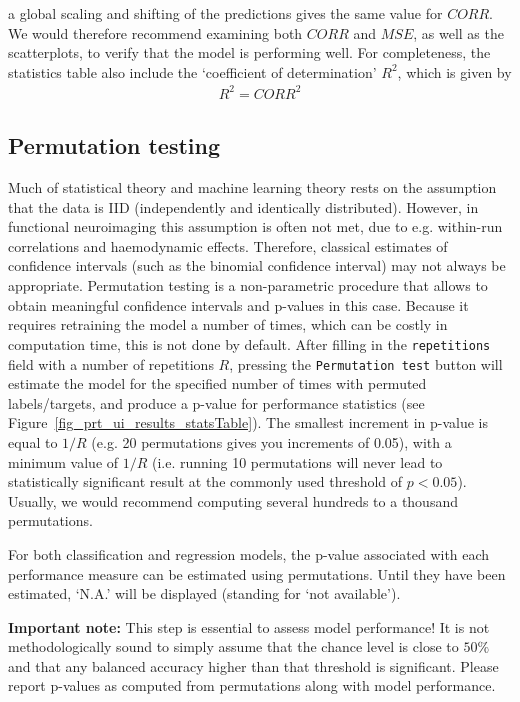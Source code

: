 a global scaling and shifting of the predictions gives the same value for $CORR$. 
We would therefore recommend examining both $CORR$ and $MSE$, as well as the scatterplots, to verify that the model is performing well.  For completeness, the statistics table also include the `coefficient of determination' $R^2$, which is given by
\begin{equation}
\begin{aligned}
R^2=CORR^2
\end{aligned}
\end{equation}


\subsection{Permutation testing}

Much of statistical theory and machine learning theory rests on the assumption that the data is
IID (independently and identically distributed). However, in functional neuroimaging this assumption
is often not met, due to e.g. within-run correlations and haemodynamic effects. Therefore, classical estimates of
confidence intervals (such as the binomial confidence interval) may not always
be appropriate. Permutation testing is a non-parametric procedure that allows to obtain meaningful 
confidence intervals and p-values in this case. Because it requires retraining the model a number of times, 
which can be costly in computation time, this is not done by default. After filling in the {\tt repetitions}
field with a number of repetitions $R$, pressing the {\tt Permutation test} button will estimate the model for the specified number of times with permuted labels/targets, and produce a  p-value for performance statistics (see Figure~\ref{fig_prt_ui_results_statsTable}). The smallest increment in p-value is equal to $1/R$ (e.g. 20 permutations gives you increments of 0.05), with a minimum value of $1/R$ (i.e. running 10 permutations will never lead to statistically significant result at the commonly used threshold of $p<0.05$). Usually, we would recommend computing several hundreds to a thousand permutations.

For both classification and regression models, the p-value associated with each performance measure can be estimated using permutations. Until they have been estimated, `N.A.' will be displayed (standing for `not available').

\textbf{Important note:} This step is essential to assess model performance! It is not methodologically sound to simply assume that the chance level is close to $50\%$ and that any balanced accuracy higher than that threshold is significant. Please report p-values as computed from permutations along with model performance.


